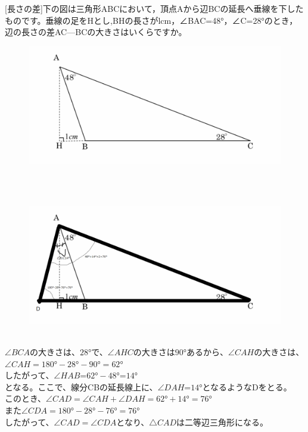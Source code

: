 \documentclass[fleqn]{jsarticle}
\begin{document}
	 [長さの差]下の図は三角形ABCにおいて，頂点Aから辺BCの延長へ垂線を下したものです。垂線の足をHとし,BHの長さがlcm，∠BAC=48°，∠C=28°のとき，辺の長さの差AC—BCの大きさはいくらですか。\\
	\begin{figure}[h]
		\includegraphics[width=14.0cm]{./2020-05-05-092534.png}
	\end{figure}
	\\
	\\
	\begin{figure}[h]
		\includegraphics[width=14.0cm]{./2020-05-05-092534ed.png}
	\end{figure}
	\\
	$\angle{BCA}$の大きさは、$28°$で、$\angle{AHC}$の大きさは$90°$あるから、$\angle{CAH}$の大きさは、\\
	$\angle{CAH}=180°-28°-90°=62°$\\
	したがって、$\angle{HAB}$=$62°-48°$=$14°$\\
	となる。ここで、線分CBの延長線上に、$\angle{DAH}$=$14°$となるようなDをとる。\\
	このとき、$\angle{CAD}=\angle{CAH}+\angle{DAH}=62°+14°=76°$\\
	また$\angle{CDA}=180°-28°-76°=76°$\\
	したがって、$\angle{CAD}=\angle{CDA}$となり、$\triangle{CAD}$は二等辺三角形になる。\\
\end{document}
